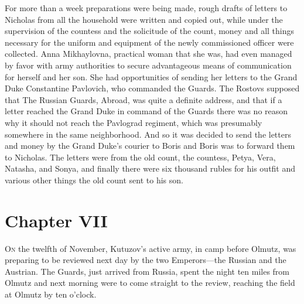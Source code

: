 For more than a week preparations were being made, rough drafts
of letters to Nicholas from all the household were written and
copied out, while under the supervision of the countess and the
solicitude of the count, money and all things necessary for the
uniform and equipment of the newly commissioned officer were
collected. Anna Mikhaylovna, practical woman that she was, had
even managed by favor with army authorities to secure
advantageous means of communication for herself and her son. She
had opportunities of sending her letters to the Grand Duke
Constantine Pavlovich, who commanded the Guards. The Rostovs
supposed that The Russian Guards, Abroad, was quite a definite
address, and that if a letter reached the Grand Duke in command
of the Guards there was no reason why it should not reach the
Pavlograd regiment, which was presumably somewhere in the same
neighborhood. And so it was decided to send the letters and money
by the Grand Duke's courier to Boris and Boris was to forward
them to Nicholas. The letters were from the old count, the
countess, Petya, Vera, Natasha, and Sonya, and finally there were
six thousand rubles for his outfit and various other things the
old count sent to his son.


\chapter*{Chapter VII}
\ifaudio     
{} 
\fi

\lettrine[lines=2, loversize=0.3, lraise=0]{\initfamily O}{n}
the twelfth of November, Kutuzov's active army, in camp before
Olmutz, was preparing to be reviewed next day by the two
Emperors---the Russian and the Austrian. The Guards, just arrived
from Russia, spent the night ten miles from Olmutz and next
morning were to come straight to the review, reaching the field
at Olmutz by ten o'clock.

